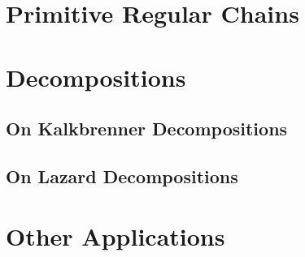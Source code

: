 \documentclass[12pt]{article}
\begin{document}
\section{Primitive Regular Chains}

\section{Decompositions}

\subsection{On Kalkbrenner Decompositions}
\subsection{On Lazard Decompositions}

\section{Other Applications}
\end{document}
